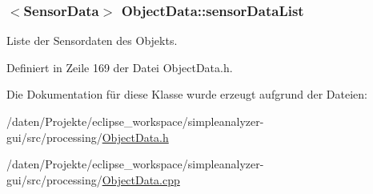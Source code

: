 \hypertarget{classObjectData_af6a1dcb4e137b1698422a912c07c7f39}{
\subsubsection[{sensor\-Data\-List}]{$<${\bf Sensor\-Data}$>$ Object\-Data\-::sensor\-Data\-List\hspace{0.3cm}{\ttfamily [private]}}}\label{classObjectData_af6a1dcb4e137b1698422a912c07c7f39}


Liste der Sensordaten des Objekts. 



Definiert in Zeile 169 der Datei Object\-Data.\-h.



Die Dokumentation für diese Klasse wurde erzeugt aufgrund der Dateien\-:\begin{DoxyCompactItemize}
\item 
/daten/\-Projekte/eclipse\-\_\-workspace/simpleanalyzer-\/gui/src/processing/\hyperlink{ObjectData_8h}{Object\-Data.\-h}\item 
/daten/\-Projekte/eclipse\-\_\-workspace/simpleanalyzer-\/gui/src/processing/\hyperlink{ObjectData_8cpp}{Object\-Data.\-cpp}\end{DoxyCompactItemize}
